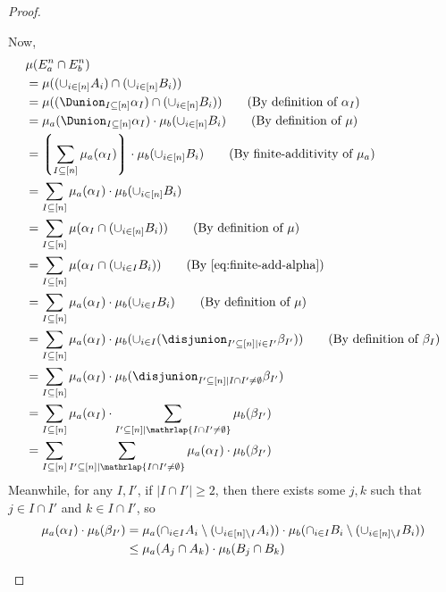 \documentclass[acmsmall,nonacm,screen,appendix]{acmart}
\begin{document}
\begin{proof}
\begin{itemize}
   Now,
  \begin{align}
   &\mu(E^n_a \cap E^n_b) \notag \\
   &= \mu((\cup_{i \in [n]} A_i) \cap (\cup_{i \in [n]} B_i)) \notag \\
   &= \mu((\Dunion_{I \subseteq [n]} \alpha_I) \cap (\cup_{i \in [n]} B_i)) \tag{By definition of $\alpha_I$}\\
   &= \mu_a(\Dunion_{I \subseteq [n]} \alpha_I) \cdot  \mu_b(\cup_{i \in [n]} B_i)  \tag{By definition of $\mu$} \\
   &= \left\lgroup\sum_{I \subseteq [n]} \mu_a (\alpha_I) \right\rgroup \cdot  \mu_b(\cup_{i \in [n]} B_i)  \tag{By finite-additivity of $\mu_a$} \\
   &= \sum_{I \subseteq [n]} \mu_a (\alpha_I) \cdot  \mu_b(\cup_{i \in [n]} B_i) \notag\\
   &= \sum_{I \subseteq [n]}  \mu(\alpha_I \cap (\cup_{i \in [n]} B_i)) \tag{By definition of $\mu$} \\
   &= \sum_{I \subseteq [n]}  \mu(\alpha_I \cap (\cup_{i \in I} B_i))
   \tag{By~\cref{eq:finite-add-alpha}}\\
   &= \sum_{I \subseteq [n]}  \mu_a(\alpha_I) \cdot \mu_b (\cup_{i \in I} B_i)\tag{By definition of $\mu$} \\
   &= \sum_{I \subseteq [n]}  \mu_a(\alpha_I) \cdot \mu_b (\cup_{i \in I} (\disjunion_{I' \subseteq [n] \mid i \in I'} \beta_{I'}))
   \tag{By definition of $\beta_I$} \\
   &= \sum_{I \subseteq [n]}  \mu_a(\alpha_I) \cdot \mu_b (\disjunion_{I' \subseteq [n] \mid I \cap I' \neq \emptyset} \beta_{I'}) \notag \\
   &= \sum_{I \subseteq [n]}  \mu_a(\alpha_I) \cdot \sum_{I' \subseteq [n] \mid \mathrlap{I \cap I' \neq \emptyset}} \mu_b (\beta_{I'}) \notag \\
   &= \sum_{I \subseteq [n]} \sum_{I' \subseteq [n] \mid \mathrlap{I \cap I' \neq \emptyset}}  \mu_a(\alpha_I) \cdot \mu_b (\beta_{I'}) \notag
  \end{align}
Meanwhile, for any $I, I'$, if $|I \cap I'| \geq 2$,
  then there exists some $j, k$ such that $j \in I \cap I'$ and $k \in I \cap I'$,
  so
\begin{align}
    \mu_{a}(\alpha_I) \cdot \mu_{b}(\beta_{I'})
    &= \mu_{a}(\cap_{i \in I} A_i \setminus (\cup_{i \in [n] \setminus I} A_i)) \cdot \mu_{b}(\cap_{i \in I} B_i \setminus (\cup_{i \in [n] \setminus I} B_i)) \notag \\
    &\leq \mu_{a}(A_j \cap A_k) \cdot \mu_{b}(B_j \cap B_k) \notag \\

\end{align}
\end{itemize}
\end{proof}
\end{document}
